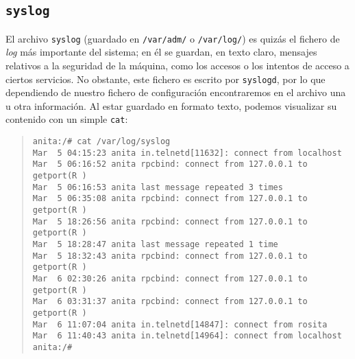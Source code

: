 \subsection{{\tt syslog}}
El archivo {\tt syslog} (guardado en {\tt /var/adm/} o {\tt /var/log/}) es
quiz\'as el fichero de {\it log} m\'as importante del sistema; en \'el se 
guardan, en texto claro, mensajes relativos a la seguridad de la 
m\'aquina, como los accesos o los intentos de acceso a ciertos servicios. No
obstante, este fichero es escrito por {\tt syslogd}, por lo que dependiendo de
nuestro fichero de configuraci\'on encontraremos en el archivo una u otra
informaci\'on. Al estar guardado en formato texto, podemos visualizar su 
contenido con un simple {\tt cat}:
\begin{quote}
\begin{verbatim}
anita:/# cat /var/log/syslog
Mar  5 04:15:23 anita in.telnetd[11632]: connect from localhost
Mar  5 06:16:52 anita rpcbind: connect from 127.0.0.1 to getport(R )
Mar  5 06:16:53 anita last message repeated 3 times
Mar  5 06:35:08 anita rpcbind: connect from 127.0.0.1 to getport(R )
Mar  5 18:26:56 anita rpcbind: connect from 127.0.0.1 to getport(R )
Mar  5 18:28:47 anita last message repeated 1 time
Mar  5 18:32:43 anita rpcbind: connect from 127.0.0.1 to getport(R )
Mar  6 02:30:26 anita rpcbind: connect from 127.0.0.1 to getport(R )
Mar  6 03:31:37 anita rpcbind: connect from 127.0.0.1 to getport(R )
Mar  6 11:07:04 anita in.telnetd[14847]: connect from rosita
Mar  6 11:40:43 anita in.telnetd[14964]: connect from localhost
anita:/# 
\end{verbatim}
\end{quote}
